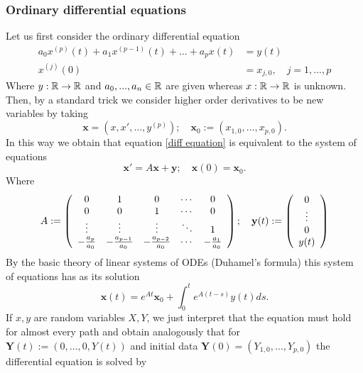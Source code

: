 \documentclass[
    a4paper,
    DIV=14,
    abstract=true,
    numbers=noenddot
]{scrartcl}
\begin{document}
\subsubsection{Ordinary differential equations}
Let us first consider the ordinary differential equation
\begin{align}\label{diff equation}
	a_0x^{(p)}(t)+a_1x^{(p-1)}(t)+\ldots+a_px(t) & =y(t) \\ x^{(j)}(0)&=x_{j,0},\quad j=1,...,p
\end{align}
Where $y:\mathbb{R}\to\mathbb{R}$ and $a_0,...,a_n\in\mathbb{R}$ are given whereas  $x:\mathbb{R}\to\mathbb{R}$ is unknown. Then, by a standard trick we consider higher order derivatives to be new variables by taking $$\mathbf{x}=(x,x',\ldots,y^{(p)});\quad \textbf{x}_0:=(x_{1,0},\ldots,x_{p,0}).$$  In this way we obtain that  equation \eqref{diff equation} is equivalent to the system of equations
\begin{equation*}
	\mathbf{x}'=A\mathbf{x}+\mathbf{y};\quad \mathbf{x}(0)=\textbf{x}_0.
\end{equation*}
Where
\begin{equation}\label{A def}
	A:=\left(\begin{array}{ccccc}
			0                  & 1                    & 0                    & \cdots & 0                  \\
			0                  & 0                    & 1                    & \cdots & 0                  \\
			\vdots             & \vdots               & \vdots               & \ddots & 1                  \\
			-\frac{a_{p}}{a_0} & -\frac{a_{p-1}}{a_0} & -\frac{a_{p-2}}{a_0} & \cdots & -\frac{a_{1}}{a_0}
		\end{array}\right);\quad \mathbf{y}(t):= \qty(\begin{array}{c}
			0      \\
			\vdots \\
			0      \\
			y(t)
		\end{array})
\end{equation}
By the basic theory of linear systems of ODEs (Duhamel's formula) this system of equations has as its solution
\begin{equation*}
	\textbf{x}(t)=e^{A t}\textbf{x}_0+\int_{0}^t e^{A(t-s)}y(t)ds.
\end{equation*}
If $x,y$ are random variables  $X,Y$, we just interpret that the equation must hold for almost every path and obtain analogously that for $\mathbf{Y}(t):=(0,\ldots,0,Y(t))$ and initial data $\mathbf{Y}(0)=(Y_{1,0},\ldots,Y_{p,0})$ the differential equation is solved by
\end{document}
